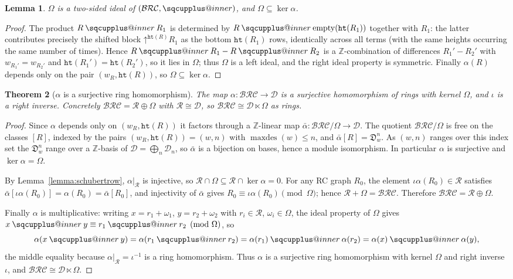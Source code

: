 \documentclass{amsart}
\makeatletter
\newtheorem{theorem}{Theorem}[section]
\newtheorem{lemma}[theorem]{Lemma}
\theoremstyle{definition}
\theoremstyle{remark}
\newcommand{\BRC}{\mathcal{BRC}}
\newcommand{\dcoma}{\mathcal{D}}
\newcommand{\dsch}{\mathfrak{D}}
\newcommand{\shup}{\mathord{\uparrow}}
\newcommand{\wof}[1]{w_{#1}}
\newcommand{\hr}{\mathtt{ht}}
\newcommand{\maxd}{\operatorname{maxdes}}
\newcommand{\sqcupplus@inner}[2]{%
  \vcenter{\hbox{\ooalign{%
    \hfil$\m@th#1\sqcup$\hfil\cr
    \hfil\raisebox{0.15ex}{$\m@th#1\scriptscriptstyle+$}\hfil\cr
  }}}%
}
\newcommand{\sqcupplus}{\mathbin{\mathpalette\sqcupplus@inner\relax}}
\makeatother
\begin{document}
\begin{lemma}\label{lemma:omegaideal}
$\Omega$ is a two-sided ideal of $(\BRC,\sqcupplus)$, and $\Omega\subseteq\ker\alpha$.
\end{lemma}
\begin{proof}
The product $R\sqcupplus R_1$ is determined by $R\sqcupplus\mathrm{empty}(\hr(R_1))$ together with $R_1$: the latter contributes precisely the shifted block $\shup^{\hr(R)}R_1$ as the bottom $\hr(R_1)$ rows, identically across all terms (with the same heights occurring the same number of times). Hence $R\sqcupplus R_1-R\sqcupplus R_2$ is a $\mathbb{Z}$-combination of differences $R_1'-R_2'$ with $\wof{R_1'}=\wof{R_2'}$ and $\hr(R_1')=\hr(R_2')$, so it lies in $\Omega$; thus $\Omega$ is a left ideal, and the right ideal property is symmetric. Finally $\alpha(R)$ depends only on the pair $(\wof{R},\hr(R))$, so $\Omega\subseteq\ker\alpha$.
\end{proof}

\begin{theorem}[$\alpha$ is a surjective ring homomorphism]\label{theorem:semidirect}
The map $\alpha:\BRC\to\dcoma$ is a surjective homomorphism of rings with kernel $\Omega$, and $\iota$ is a right inverse. Concretely $\BRC=\mathcal{R}\oplus\Omega$ with $\mathcal{R}\cong\dcoma$, so $\BRC\cong\dcoma\ltimes\Omega$ as rings.
\end{theorem}
\begin{proof}
Since $\alpha$ depends only on $(\wof{R},\hr(R))$ it factors through a $\mathbb{Z}$-linear map $\bar\alpha:\BRC/\Omega\to\dcoma$. The quotient $\BRC/\Omega$ is free on the classes $[R]$, indexed by the pairs $(\wof{R},\hr(R))=(w,n)$ with $\maxd(w)\leq n$, and $\bar\alpha[R]=\dsch_w^n$. As $(w,n)$ ranges over this index set the $\dsch_w^n$ range over a $\mathbb{Z}$-basis of $\dcoma=\bigoplus_n\dcoma_n$, so $\bar\alpha$ is a bijection on bases, hence a module isomorphism. In particular $\alpha$ is surjective and $\ker\alpha=\Omega$.

By Lemma~\ref{lemma:schubertrow}, $\alpha|_{\mathcal{R}}$ is injective, so $\mathcal{R}\cap\Omega\subseteq\mathcal{R}\cap\ker\alpha=0$. For any RC graph $R_0$, the element $\iota\alpha(R_0)\in\mathcal{R}$ satisfies $\bar\alpha[\iota\alpha(R_0)]=\alpha(R_0)=\bar\alpha[R_0]$, and injectivity of $\bar\alpha$ gives $R_0\equiv\iota\alpha(R_0)\pmod\Omega$; hence $\mathcal{R}+\Omega=\BRC$. Therefore $\BRC=\mathcal{R}\oplus\Omega$.

Finally $\alpha$ is multiplicative: writing $x=r_1+\omega_1$, $y=r_2+\omega_2$ with $r_i\in\mathcal{R}$, $\omega_i\in\Omega$, the ideal property of $\Omega$ gives $x\sqcupplus y\equiv r_1\sqcupplus r_2\pmod\Omega$, so
\[
\alpha(x\sqcupplus y)=\alpha(r_1\sqcupplus r_2)=\alpha(r_1)\sqcupplus\alpha(r_2)=\alpha(x)\sqcupplus\alpha(y),
\]
the middle equality because $\alpha|_{\mathcal{R}}=\iota^{-1}$ is a ring homomorphism. Thus $\alpha$ is a surjective ring homomorphism with kernel $\Omega$ and right inverse $\iota$, and $\BRC\cong\dcoma\ltimes\Omega$.
\end{proof}
\end{document}
